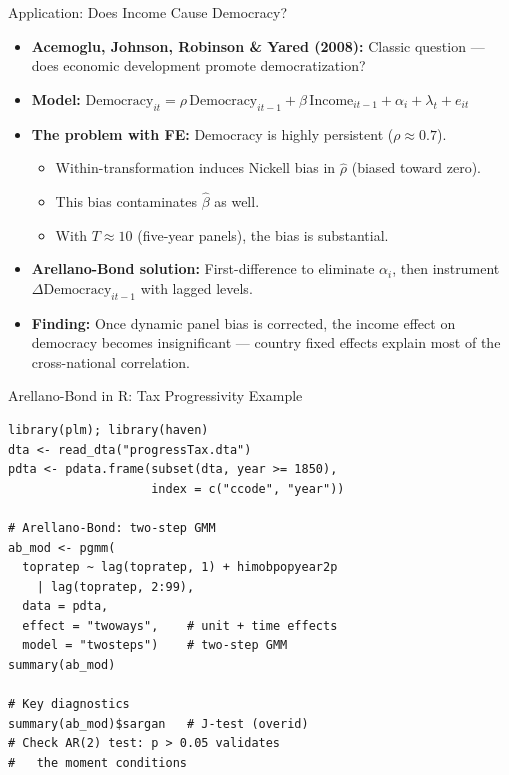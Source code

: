 \documentclass[aspectratio=169, handout, t]{beamer}
\numberwithin{equation}{section}
\begin{document}
\begin{frame}{Application: Does Income Cause Democracy?}
\begin{itemize}
\item \textbf{Acemoglu, Johnson, Robinson \& Yared (2008):} Classic question --- does economic development promote democratization?
\item \textbf{Model:} $\text{Democracy}_{it}=\rho\,\text{Democracy}_{it-1}+\beta\,\text{Income}_{it-1}+\alpha_i+\lambda_t+e_{it}$\pause
\item \textbf{The problem with FE:} Democracy is highly persistent ($\rho\approx 0.7$).
\begin{itemize}
\item Within-transformation induces Nickell bias in $\hat{\rho}$ (biased toward zero).
\item This bias contaminates $\hat{\beta}$ as well.
\item With $T\approx 10$ (five-year panels), the bias is substantial.
\end{itemize}\pause
\item \textbf{Arellano-Bond solution:} First-difference to eliminate $\alpha_i$, then instrument $\Delta\text{Democracy}_{it-1}$ with lagged levels.
\item \textbf{Finding:} Once dynamic panel bias is corrected, the income effect on democracy becomes insignificant --- country fixed effects explain most of the cross-national correlation.
\end{itemize}
\end{frame}

\begin{frame}[fragile]{Arellano-Bond in R: Tax Progressivity Example}
\begin{lstlisting}[basicstyle=\ttfamily\scriptsize]
library(plm); library(haven)
dta <- read_dta("progressTax.dta")
pdta <- pdata.frame(subset(dta, year >= 1850),
                    index = c("ccode", "year"))

# Arellano-Bond: two-step GMM
ab_mod <- pgmm(
  topratep ~ lag(topratep, 1) + himobpopyear2p
    | lag(topratep, 2:99),
  data = pdta,
  effect = "twoways",    # unit + time effects
  model = "twosteps")    # two-step GMM
summary(ab_mod)

# Key diagnostics
summary(ab_mod)$sargan   # J-test (overid)
# Check AR(2) test: p > 0.05 validates
#   the moment conditions
\end{lstlisting}
\end{frame}
\end{document}
